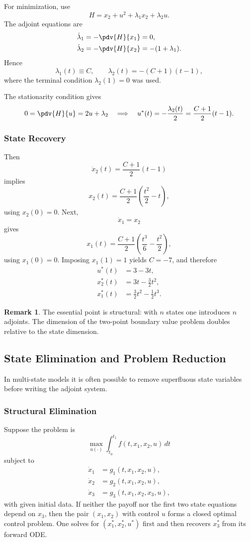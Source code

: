 \documentclass[11pt]{article}
\theoremstyle{definition}
\newtheorem{remark}{Remark}
\begin{document}
For minimization, use
\[
H=x_2+u^2+\lambda_1 x_2+\lambda_2 u.
\]
The adjoint equations are
\begin{align}
\dot{\lambda}_1 &= -\pdv{H}{x_1}=0, \\
\dot{\lambda}_2 &= -\pdv{H}{x_2}=-(1+\lambda_1).
\end{align}
Hence
\[
\lambda_1(t)\equiv C, \qquad
\lambda_2(t)=-(C+1)(t-1),
\]
where the terminal condition $\lambda_2(1)=0$ was used.

The stationarity condition gives
\[
0=\pdv{H}{u}=2u+\lambda_2
\quad \Longrightarrow \quad
u^*(t)=-\frac{\lambda_2(t)}{2}=\frac{C+1}{2}(t-1).
\]

\subsubsection{State Recovery}

Then
\[
\dot{x}_2(t)=\frac{C+1}{2}(t-1)
\]
implies
\[
x_2(t)=\frac{C+1}{2}\left(\frac{t^2}{2}-t\right),
\]
using $x_2(0)=0$. Next,
\[
\dot{x}_1=x_2
\]
gives
\[
x_1(t)=\frac{C+1}{2}\left(\frac{t^3}{6}-\frac{t^2}{2}\right),
\]
using $x_1(0)=0$. Imposing $x_1(1)=1$ yields $C=-7$, and therefore
\begin{align}
u^*(t) &= 3-3t,\\
x_2^*(t) &= 3t-\frac{3}{2}t^2,\\
x_1^*(t) &= \frac{3}{2}t^2-\frac{1}{2}t^3.
\end{align}

\begin{remark}
The essential point is structural: with $n$ states one introduces $n$ adjoints. The dimension of the two-point boundary value problem doubles relative to the state dimension.
\end{remark}

\subsection{State Elimination and Problem Reduction}

In multi-state models it is often possible to remove superfluous state variables before writing the adjoint system.

\subsubsection{Structural Elimination}

Suppose the problem is
\[
\max_{u(\cdot)} \int_{t_0}^{t_1} f(t,x_1,x_2,u)\,dt
\]
subject to
\begin{align}
\dot{x}_1 &= g_1(t,x_1,x_2,u),\\
\dot{x}_2 &= g_2(t,x_1,x_2,u),\\
\dot{x}_3 &= g_3(t,x_1,x_2,x_3,u),
\end{align}
with given initial data. If neither the payoff nor the first two state equations depend on $x_3$, then the pair $(x_1,x_2)$ with control $u$ forms a closed optimal control problem. One solves for $(x_1^*,x_2^*,u^*)$ first and then recovers $x_3^*$ from its forward ODE.
\end{document}
